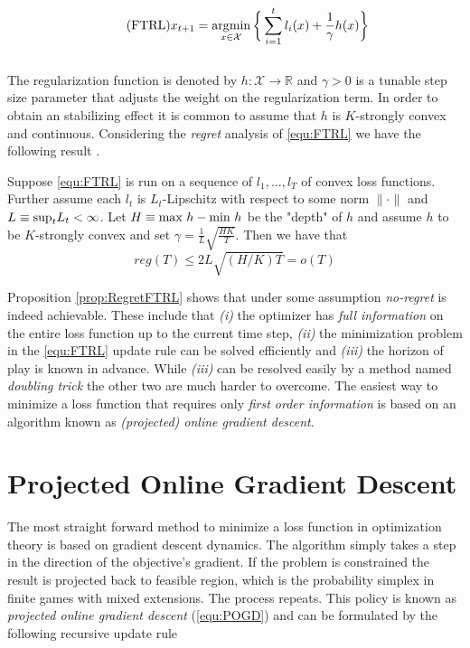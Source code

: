 \begin{equation}
    \tag{FTRL}
    x_{t+1} = \operatorname*{\arg\!\min}_{x \in \mathcal{X}} \bigg\{\sum_{i=1}^t l_i(x) + \frac{1}{\gamma}h(x)\bigg\}
    \label{equ:FTRL}
\end{equation} \\

The regularization function is denoted by $h: \mathcal{X} \to \mathbb{R}$ and $\gamma > 0$ is a tunable step size parameter that adjusts the weight on the regularization term. In order to obtain an stabilizing effect it is common to assume that $h$ is $K$-strongly convex and continuous. Considering the \textit{regret} analysis of \ref{equ:FTRL} we have the following result \cite[Theorem 2.1]{HDRmertikopoulos}.

\begin{proposition}\label{prop:RegretFTRL}
    Suppose \ref{equ:FTRL} is run on a sequence of $l_1,\dots,l_T$ of convex loss functions. Further assume each $l_t$ is $L_t$-Lipschitz with respect to some norm $\|\cdot\|$ and $L \equiv \textnormal{sup}_t L_t < \infty$. Let $H \equiv \textnormal{max } h-\textnormal{min } h$ be the "depth" of $h$ and assume $h$ to be $K$-strongly convex and set $\gamma = \frac{1}{L}\sqrt{\frac{HK}{T}}$. Then we have that
    \[reg(T) \le 2L\sqrt{(H/K)T} = o(T)\]
\end{proposition} 

Proposition \ref{prop:RegretFTRL} shows that under some assumption \textit{no-regret} is indeed achievable. These include that \textit{(i)} the optimizer has \textit{full information} on the entire loss function up to the current time step, \textit{(ii)} the minimization problem in the \ref{equ:FTRL} update rule can be solved efficiently and \textit{(iii)} the horizon of play is known in advance. While \textit{(iii)} can be resolved easily by a method named \textit{doubling trick} \cite{shalev} the other two are much harder to overcome. The easiest way to minimize a loss function that requires only \textit{first order information} is based on an algorithm known as \textit{(projected) online gradient descent}.


\section{Projected Online Gradient Descent}\label{section:ProjectedOnlineGradienDescent}

The most straight forward method to minimize a loss function in optimization theory is based on gradient descent dynamics. The algorithm simply takes a step in the direction of the objective's gradient. If the problem is constrained the result is projected back to feasible region, which is the probability simplex in finite games with mixed extensions. The process repeats. This policy is known as \textit{projected online gradient descent} (\ref{equ:POGD}) and can be formulated by the following recursive update rule


